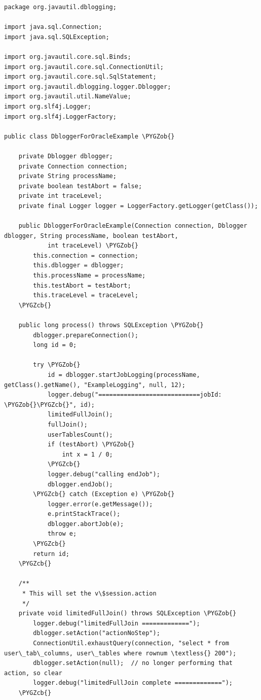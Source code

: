 \documentclass[letterpaper,10pt,english]{sphinxmanual}
\def\PYGZob{\char`\{}
\def\PYGZcb{\char`\}}
\begin{document}
\begin{Verbatim}[commandchars=\\\{\}]
package org.javautil.dblogging;

import java.sql.Connection;
import java.sql.SQLException;

import org.javautil.core.sql.Binds;
import org.javautil.core.sql.ConnectionUtil;
import org.javautil.core.sql.SqlStatement;
import org.javautil.dblogging.logger.Dblogger;
import org.javautil.util.NameValue;
import org.slf4j.Logger;
import org.slf4j.LoggerFactory;

public class DbloggerForOracleExample \PYGZob{}

    private Dblogger dblogger;
    private Connection connection;
    private String processName;
    private boolean testAbort = false;
    private int traceLevel;
    private final Logger logger = LoggerFactory.getLogger(getClass());

    public DbloggerForOracleExample(Connection connection, Dblogger dblogger, String processName, boolean testAbort,
            int traceLevel) \PYGZob{}
        this.connection = connection;
        this.dblogger = dblogger;
        this.processName = processName;
        this.testAbort = testAbort;
        this.traceLevel = traceLevel;
    \PYGZcb{}

    public long process() throws SQLException \PYGZob{}
        dblogger.prepareConnection();
        long id = 0;

        try \PYGZob{}
            id = dblogger.startJobLogging(processName, getClass().getName(), "ExampleLogging", null, 12);
            logger.debug("============================jobId: \PYGZob{}\PYGZcb{}", id);
            limitedFullJoin();
            fullJoin();
            userTablesCount();
            if (testAbort) \PYGZob{}
                int x = 1 / 0;
            \PYGZcb{}
            logger.debug("calling endJob");
            dblogger.endJob();
        \PYGZcb{} catch (Exception e) \PYGZob{}
            logger.error(e.getMessage());
            e.printStackTrace();
            dblogger.abortJob(e);
            throw e;
        \PYGZcb{}
        return id;
    \PYGZcb{}

    /**
     * This will set the v\$session.action
     */
    private void limitedFullJoin() throws SQLException \PYGZob{}
        logger.debug("limitedFullJoin =============");
        dblogger.setAction("actionNoStep");
        ConnectionUtil.exhaustQuery(connection, "select * from user\_tab\_columns, user\_tables where rownum \textless{} 200");
        dblogger.setAction(null);  // no longer performing that action, so clear
        logger.debug("limitedFullJoin complete =============");
    \PYGZcb{}


\end{Verbatim}
\end{document}
